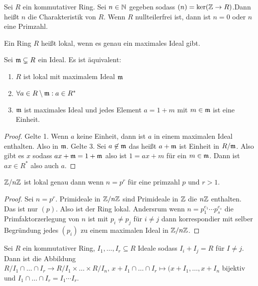 \begin{Def}
	Sei \(R\) ein kommutativer Ring. Sei \(n\in \mathbb{N}\) gegeben sodass \((n)=\ker(\mathbb{Z}\to R)\).Dann heißt \(n\) die Charakteristik von \(R\). Wenn \(R\) nullteilerfrei ist, dann ist \(n=0\) oder \(n\) eine Primzahl.
\end{Def}\begin{Def}
	Ein Ring \(R\) heißt lokal, wenn es genau ein maximales Ideal gibt.
\end{Def}
\begin{Satz}
	Sei \(\mathfrak{m}\subsetneq R\) ein Ideal. Es ist äquivalent:
	\begin{enumerate}
		\item \(R\) ist lokal mit maximalem Ideal \(\mathfrak{m}\)
		\item \(\forall a\in R\setminus \mathfrak{m}: a\in R^*\)
		\item \(\mathfrak{m}\) ist maximales Ideal und jedes Element \(a=1+m\) mit \(m\in\mathfrak{m}\) ist eine Einheit.
	\end{enumerate}
\end{Satz}
\begin{proof}
	Gelte 1. Wenn \(a\) keine Einheit, dann ist \(a\) in einem maximalen Ideal enthalten. Also in \(\mathfrak{m}\).
	Gelte 3. Sei \(a\not \in\mathfrak{m}\) das heißt \(a+\mathfrak{m}\) ist Einheit in \(R/\mathfrak{m}\). Also gibt es \(x\) sodass \(ax+\mathfrak{m}=1+\mathfrak{m}\) also ist \(1=ax+m\) für ein \(m\in\mathfrak{m}\). Dann ist \(ax\in R^*\) also auch \(a\).
\end{proof}
\begin{Lemma}
	\(\mathbb{Z}/n\mathbb{Z}\) ist lokal genau dann wenn \(n=p^r\) für eine primzahl \(p\) und \(r>1\).
\end{Lemma}
\begin{proof}
	Sei \(n=p^r\). Primideale in \(\mathbb{Z}/n\mathbb{Z}\) sind Primideale in \(\mathbb{Z}\) die \(n\mathbb{Z}\) enthalten. Das ist nur \((p)\). Also ist der Ring lokal.
	Andersrum wenn \(n=p_1^{e_1}\cdots p_s^{e_s}\) die Primfaktorzerlegung von \(n\) ist mit \(p_i\neq p_j\) für \(i\neq j\) dann korrespondier mit selber Begründung jedes \((p_i)\) zu einem maximalen Ideal in \(\mathbb{Z}/n\mathbb{Z}\).
\end{proof}
\begin{Satz} \label{Satz:ChinRest}
	Sei \(R\) ein kommutativer Ring, \(I_1,\dots,I_r\subseteq R\) Ideale sodass \(I_i+I_j=R\) für \(I\neq j\).
	Dann ist die Abbildung \(R/I_1\cap\dots\cap I_r\to R/I_1\times\dots\times R/I_n,\, x+I_1\cap\dots\cap I_r\mapsto (x+I_1,\dots,x+I_n\) bijektiv und \(I_1\cap\dots\cap I_r=I_1\cdots I_r\).
\end{Satz}

